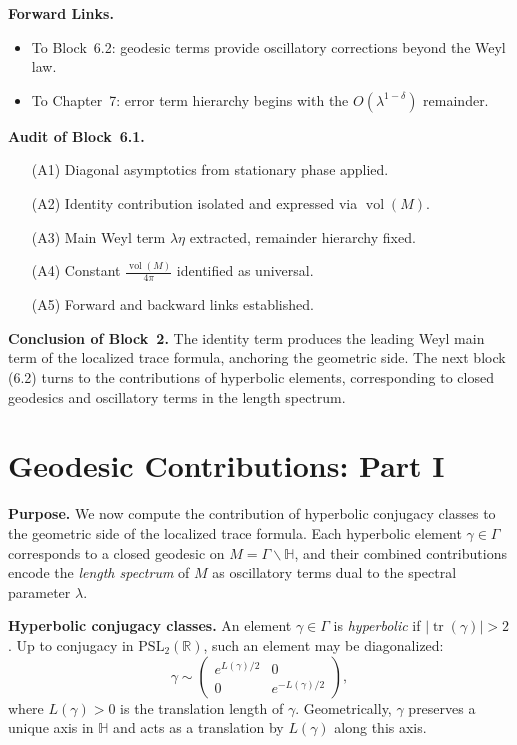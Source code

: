 \medskip

\noindent\textbf{Forward Links.}
\begin{itemize}
  \item To Block~6.2: geodesic terms provide oscillatory corrections beyond the Weyl law.
  \item To Chapter~7: error term hierarchy begins with the $O(\lambda^{1-\delta})$ remainder.
\end{itemize}

\medskip

\noindent\textbf{Audit of Block~6.1.}
\begin{itemize}
  \item[(A1)] Diagonal asymptotics from stationary phase applied.
  \item[(A2)] Identity contribution isolated and expressed via $\operatorname{vol}(M)$.
  \item[(A3)] Main Weyl term $\lambda\eta$ extracted, remainder hierarchy fixed.
  \item[(A4)] Constant $\tfrac{\operatorname{vol}(M)}{4\pi}$ identified as universal.
  \item[(A5)] Forward and backward links established.
\end{itemize}

\medskip

\noindent\textbf{Conclusion of Block~2.}
The identity term produces the leading Weyl main term of the localized trace formula,  
anchoring the geometric side.  
The next block (6.2) turns to the contributions of hyperbolic elements,  
corresponding to closed geodesics and oscillatory terms in the length spectrum.


\section{Geodesic Contributions: Part I}

\noindent\textbf{Purpose.}
We now compute the contribution of hyperbolic conjugacy classes to the geometric side of the localized trace formula.  
Each hyperbolic element $\gamma\in\Gamma$ corresponds to a closed geodesic on $M=\Gamma\backslash\mathbb{H}$,  
and their combined contributions encode the \emph{length spectrum} of $M$ as oscillatory terms dual to the spectral parameter $\lambda$.

\medskip

\noindent\textbf{Hyperbolic conjugacy classes.}
An element $\gamma\in\Gamma$ is \emph{hyperbolic} if $|\operatorname{tr}(\gamma)|>2$.  
Up to conjugacy in $\mathrm{PSL}_2(\mathbb{R})$, such an element may be diagonalized:
\[
  \gamma \sim
  \begin{pmatrix}
    e^{L(\gamma)/2} & 0 \\
    0 & e^{-L(\gamma)/2}
  \end{pmatrix},
\]
where $L(\gamma)>0$ is the translation length of $\gamma$.  
Geometrically, $\gamma$ preserves a unique axis in $\mathbb{H}$ and acts as a translation by $L(\gamma)$ along this axis.

